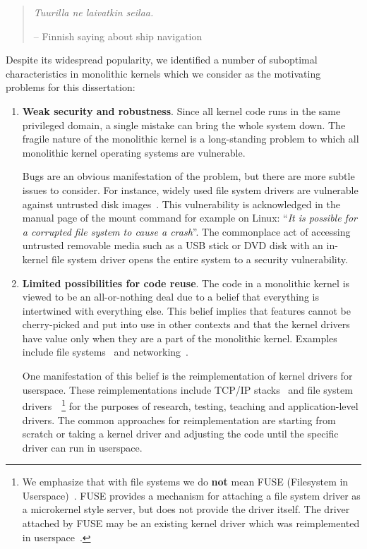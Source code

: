 \begin{quote}
\emph{Tuurilla ne laivatkin seilaa.}

-- Finnish saying about ship navigation
\end{quote}

Despite its widespread popularity, we identified a number of
suboptimal characteristics in monolithic kernels which we consider
as the motivating problems for this dissertation:

\begin{enumerate}
\item   \textbf{Weak security and robustness}.
	Since all kernel code runs in the same privileged domain, a
	single mistake can bring the whole system down.  The fragile
	nature of the monolithic kernel is a long-standing problem to
	which all monolithic kernel operating systems are vulnerable.

	Bugs are an obvious manifestation of the problem,
	but there are more subtle issues to consider.  For instance,
	widely used file system drivers are vulnerable against
	untrusted disk images~\cite{yang:exe}.	This vulnerability is
	acknowledged in the manual page of the mount command for example
	on Linux: ``\textit{It is possible for a corrupted file system
	to cause a crash}''.
	The commonplace act of accessing untrusted removable media such
	as a USB stick or DVD disk with an in-kernel file system driver
	opens the entire system to a security vulnerability.

\item	\textbf{Limited possibilities for code reuse}. The code in a
	monolithic kernel is viewed
	to be an all-or-nothing deal due to a belief that
	everything is intertwined with everything else.
	This belief implies
	that features cannot be cherry-picked and put into use in other
	contexts and that the kernel drivers have value only when they
	are a part of the monolithic kernel.
	Examples include file systems~\cite{yang:exe} and
	networking~\cite{musuvathi:netmodelcheck}.

	One manifestation of this belief is the reimplementation
	of kernel drivers for userspace.  These reimplementations include TCP/IP
	stacks~\cite{dinda:minet,pradhan:daytona} and file system
	drivers~\cite{e2fsprogs, mtools, sun:testfs}~\footnote
	{
		We emphasize that with file systems we do
		\textbf{not} mean FUSE (Filesystem in
		Userspace)~\cite{fuse}.  FUSE provides a mechanism
		for attaching a file system driver as a microkernel
		style server, but does not provide the driver
		itself.  The driver attached by FUSE may be an
		existing kernel driver which was reimplemented in
		userspace~\cite{e2fsprogs, fuseext2}.
	}
	for the purposes of research, testing, teaching and
	application-level drivers.  The common approaches for reimplementation
	are starting from scratch or taking a kernel driver and
	adjusting the code until the specific driver can run in
	userspace.


\end{enumerate}
